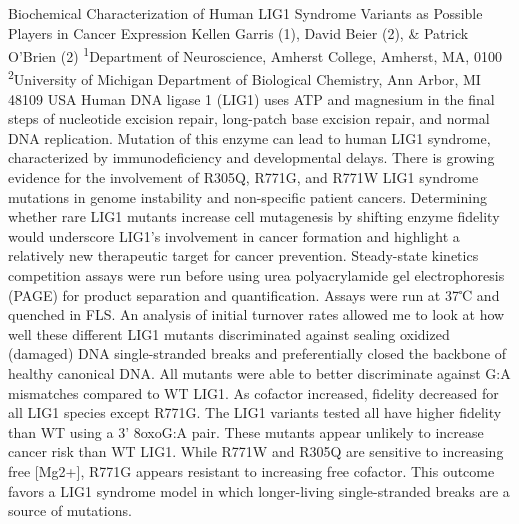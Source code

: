 \makeabstract
{
Biochemical Characterization of Human LIG1 Syndrome Variants as Possible Players in Cancer Expression 
}
{
Kellen Garris (1), David Beier (2), \& Patrick O’Brien (2)
}
{
\textsuperscript{1}Department of Neuroscience, Amherst College, Amherst, MA, 0100\\
\textsuperscript{2}University of Michigan Department of Biological Chemistry, Ann Arbor, MI 48109 USA
}
{
Human DNA ligase 1 (LIG1) uses ATP and magnesium in the final steps of nucleotide excision repair, long-patch base excision repair, and normal DNA replication. Mutation of this enzyme can lead to human LIG1 syndrome, characterized by immunodeficiency and developmental delays. There is growing evidence for the involvement of R305Q, R771G, and R771W LIG1 syndrome mutations in genome instability and non-specific patient cancers. Determining whether rare LIG1 mutants increase cell mutagenesis by shifting enzyme fidelity would underscore LIG1’s involvement in cancer formation and highlight a relatively new therapeutic target for cancer prevention. 
}
{
Steady-state kinetics competition assays were run before using urea polyacrylamide gel electrophoresis (PAGE) for product separation and quantification. Assays were run at 37℃ and quenched in FLS. An analysis of initial turnover rates allowed me to look at how well these different LIG1 mutants discriminated against sealing oxidized (damaged) DNA single-stranded breaks and preferentially closed the backbone of healthy canonical DNA. 
}
{
All mutants were able to better discriminate against G:A mismatches compared to WT LIG1. As cofactor increased, fidelity decreased for all LIG1 species except R771G. 
}
{
The LIG1 variants tested all have higher fidelity than WT using a 3’ 8oxoG:A pair. These mutants appear unlikely to increase cancer risk than WT LIG1. While R771W and R305Q are sensitive to increasing free [Mg2+], R771G appears resistant to increasing free cofactor. This outcome favors a LIG1 syndrome model in which longer-living single-stranded breaks are a source of mutations. 
}

\newpage
